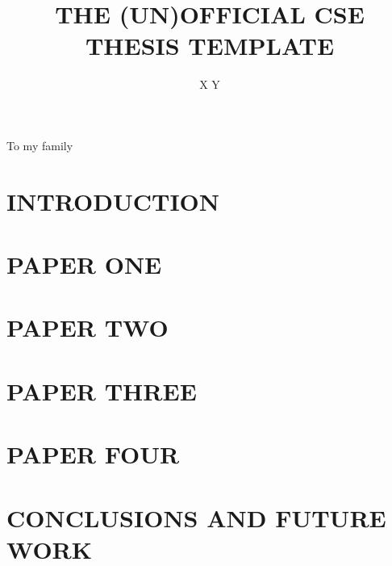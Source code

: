 \documentclass[12pt]{report}
\begin{document}
  \author{X Y}
  \title{\uppercase{The (Un)official CSE Thesis Template}}

\titlepage

\signaturepagePhD
\copyrightpage

\newpage
\thispagestyle{empty}
	\vspace*{1.0in}
	\begin{center}
    To my family
	\end{center}
\newpage

\begin{acknowledgements}

\end{acknowledgements}
\begin{abstract}

\indent
\end{abstract}
\tableofcontents
{}%

\chapter{INTRODUCTION}


\chapter{PAPER ONE}


\chapter{PAPER TWO}


\chapter{PAPER THREE}


\chapter{PAPER FOUR}


\chapter{CONCLUSIONS AND FUTURE WORK}


{\footnotesize
{}

}

\thebiography

\end{document}
